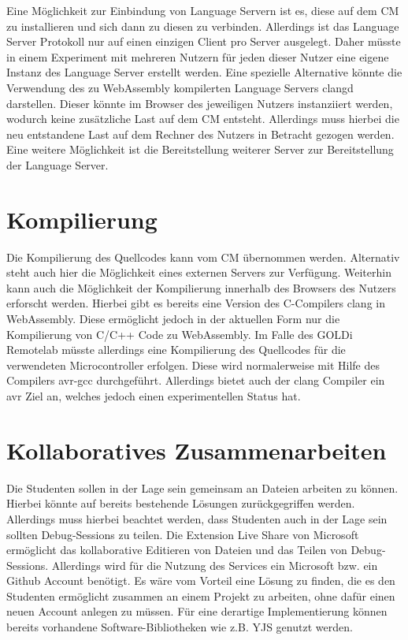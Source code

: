 Eine Möglichkeit zur Einbindung von Language Servern ist es, diese auf dem CM zu installieren und sich dann zu diesen zu verbinden. Allerdings ist das Language Server Protokoll nur auf einen einzigen Client pro Server ausgelegt. Daher müsste in einem Experiment mit mehreren Nutzern für jeden dieser Nutzer eine eigene Instanz des Language Server erstellt werden. Eine spezielle Alternative könnte die Verwendung des zu WebAssembly kompilerten Language Servers clangd darstellen. Dieser könnte im Browser des jeweiligen Nutzers instanziiert werden, wodurch keine zusätzliche Last auf dem CM entsteht. Allerdings muss hierbei die neu entstandene Last auf dem Rechner des Nutzers in Betracht gezogen werden. Eine weitere Möglichkeit ist die Bereitstellung weiterer Server zur Bereitstellung der Language Server.

\section{Kompilierung}

Die Kompilierung des Quellcodes kann vom CM übernommen werden. Alternativ steht auch hier die Möglichkeit eines externen Servers zur Verfügung. Weiterhin kann auch die Möglichkeit der Kompilierung innerhalb des Browsers des Nutzers erforscht werden. Hierbei gibt es bereits eine Version des C-Compilers clang in WebAssembly. Diese ermöglicht jedoch in der aktuellen Form nur die Kompilierung von C/C++ Code zu WebAssembly. Im Falle des GOLDi Remotelab müsste allerdings eine Kompilierung des Quellcodes für die verwendeten Microcontroller erfolgen. Diese wird normalerweise mit Hilfe des Compilers avr-gcc durchgeführt. Allerdings bietet auch der clang Compiler ein avr Ziel an, welches jedoch einen experimentellen Status hat.

\section{Kollaboratives Zusammenarbeiten}

Die Studenten sollen in der Lage sein gemeinsam an Dateien arbeiten zu können. Hierbei könnte auf bereits bestehende Lösungen zurückgegriffen werden. Allerdings muss hierbei beachtet werden, dass Studenten auch in der Lage sein sollten Debug-Sessions zu teilen. Die Extension Live Share von Microsoft ermöglicht das kollaborative Editieren von Dateien und das Teilen von Debug-Sessions. Allerdings wird für die Nutzung des Services ein Microsoft bzw. ein Github Account benötigt. Es wäre vom Vorteil eine Lösung zu finden, die es den Studenten ermöglicht zusammen an einem Projekt zu arbeiten, ohne dafür einen neuen Account anlegen zu müssen. Für eine derartige Implementierung können bereits vorhandene Software-Bibliotheken wie z.B. YJS genutzt werden.

